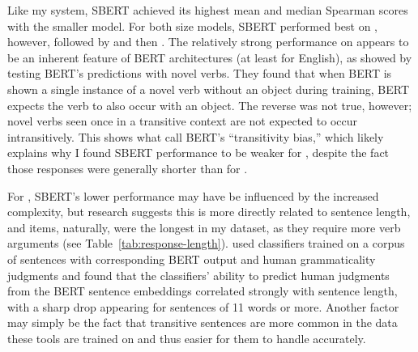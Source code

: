 Like my system, SBERT achieved its highest mean and median Spearman scores with the smaller model. For both size models, SBERT performed best on , however, followed by  and then .
The relatively strong performance on  appears to be an inherent feature of BERT architectures (at least for English), as \citet{thrush2020} showed by testing BERT's predictions with novel verbs. They found that when BERT is shown a single instance of a novel verb without an object during training, BERT expects the verb to also occur with an object. The reverse was not true, however; novel verbs seen once in a transitive context are not expected to occur intransitively. This shows what \citet{thrush2020} call BERT's ``transitivity bias,'' which likely explains why I found SBERT performance to be weaker for , despite the fact those responses were generally shorter than for .

For , SBERT's lower performance may have be influenced by the increased complexity, but research suggests this is more directly related to sentence length, and  items, naturally, were the longest in my dataset, as they require more verb arguments (see Table~\ref{tab:response-length}). \citet{warstadt2019} used classifiers trained on a corpus of sentences with corresponding BERT output and human grammaticality judgments and found that the classifiers' ability to predict human judgments from the BERT sentence embeddings correlated strongly with sentence length, with a sharp drop appearing for sentences of 11 words or more. Another factor may simply be the fact that transitive sentences are more common in the data these tools are trained on and thus easier for them to handle accurately.

